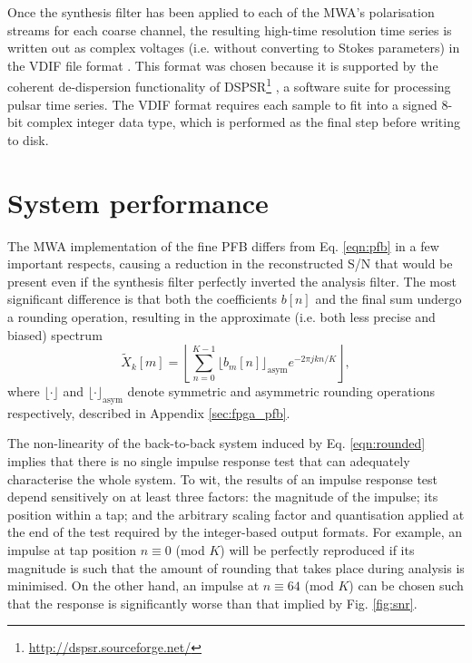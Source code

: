 \documentclass{pasa}%
\begin{document}
Once the synthesis filter has been applied to each of the MWA's polarisation streams for each coarse channel, the resulting high-time resolution time series is written out as complex voltages (i.e. without converting to Stokes parameters) in the VDIF file format \citep{Whitney2009}.
This format was chosen because it is supported by the coherent de-dispersion functionality of DSPSR\footnote{\url{http://dspsr.sourceforge.net/}} \citep{VanStraten2011b}, a software suite for processing pulsar time series.
The VDIF format requires each sample to fit into a signed 8-bit complex integer data type, which is performed as the final step before writing to disk.

\section{System performance}

The MWA implementation of the fine PFB differs from Eq. \eqref{eqn:pfb} in a few important respects, causing a reduction in the reconstructed S/N that would be present even if the synthesis filter perfectly inverted the analysis filter.
The most significant difference is that both the coefficients $b[n]$ and the final sum undergo a rounding operation, resulting in the approximate (i.e. both less precise and biased) spectrum
\begin{equation}
    \tilde{X}_k[m] = \left\lfloor\sum_{n=0}^{K-1} \bigg\lfloor b_m[n] \bigg\rfloor_{\text{asym}} e^{-2\pi jkn/K}\right\rfloor,
    \label{eqn:rounded}
\end{equation}
where $\lfloor\cdot\rfloor$ and $\lfloor\cdot\rfloor_{\text{asym}}$ denote symmetric and asymmetric rounding operations respectively, described in Appendix \ref{sec:fpga_pfb}.

The non-linearity of the back-to-back system induced by Eq. \eqref{eqn:rounded} implies that there is no single impulse response test that can adequately characterise the whole system.
To wit, the results of an impulse response test depend sensitively on at least three factors: the magnitude of the impulse; its position within a tap; and the arbitrary scaling factor and quantisation applied at the end of the test required by the integer-based output formats.
For example, an impulse at tap position $n \equiv 0$ (mod $K$) will be perfectly reproduced if its magnitude is such that the amount of rounding that takes place during analysis is minimised.
On the other hand, an impulse at $n \equiv 64$ (mod $K$) can be chosen such that the response is significantly worse than that implied by Fig. \ref{fig:snr}.
\end{document}
